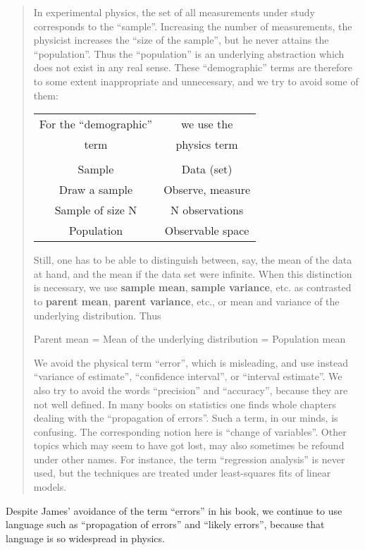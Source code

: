 \documentclass[12pt]{article}
\begin{document}
\begin{quote}
\noindent In experimental physics, the set of all measurements under study corresponds to
   the ``sample''.	
Increasing the number of measurements, the physicist increases the ``size of the sample'', 
     but he never attains the ``population''.
Thus the ``population'' is an underlying abstraction which does not exist in any real sense.
These ``demographic'' terms are therefore to some extent inappropriate and unnecessary,
   and we try to avoid some of them:
\begin{center}
   \begin{tabular}{c c}
       For the ``demographic''     &   we use the  \\
                 term                        &   physics term  \\
         \hline  \\
       Sample  &  Data (set)  \\
        Draw a sample   &  Observe, measure  \\
        Sample of size N  &   N observations  \\
        Population          &  Observable space
    \end{tabular}
\end{center}	
Still, one has to be able to distinguish between, say, the mean of the data at hand, and the mean if the data set were infinite. When this distinction is necessary, we use \textbf{sample mean}, \textbf{sample variance}, etc. as contrasted
    to \textbf{parent mean}, \textbf{parent variance}, etc., or mean and variance of the underlying distribution.  Thus
\begin{myVerbatim1}
 Parent mean = Mean of the underlying distribution = Population mean
\end{myVerbatim1}
We avoid the physical term ``error'', which is misleading, and use instead ``variance of estimate'', ``confidence interval'', or ``interval estimate''. We also try to avoid the words ``precision'' and ``accuracy'', because they are not well defined.
In many books on statistics one finds whole chapters dealing with the ``propagation of errors''. Such a term, in our minds, is confusing. The corresponding notion here is ``change of variables''.
Other topics which may seem to have got lost, may also sometimes be refound under other names. For instance, the term ``regression analysis'' is never used, but the techniques are treated under least-squares fits of linear models.
\end{quote}   
Despite James' avoidance of the term ``errors'' in his book, we continue to
  use language such as ``propagation of errors'' and ``likely errors'',  because that language is so
  widespread in physics.\\
  
\end{document}
